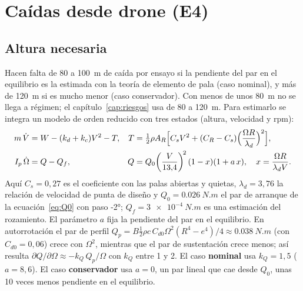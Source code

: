 \section{Caídas desde drone (E4)}\label{sec:ensayos-drone}

\subsection{Altura necesaria}
Hacen falta de 80 a \SI{100}{m} de caída por ensayo si la pendiente del par en el
equilibrio es la estimada con la teoría de elemento de pala (caso nominal), y más de
\SI{120}{m} si es mucho menor (caso conservador). Con menos de unos \SI{80}{m} no se llega
a régimen; el capítulo~\ref{cap:riesgos} usa de 80 a \SI{120}{m}. Para estimarlo se
integra un modelo de orden reducido con tres estados (altura, velocidad y rpm):
\begin{align}
  m\,\dot V &= W - (k_d+k_c)V^2 - T, &
  T &= \tfrac12\rho A_R\Bigl[C_s V^2 + (C_{R} - C_s)\Bigl(\frac{\Omega R}{\lambda_d}\Bigr)^2\Bigr],
  \label{eq:ensayos-modeloV}\\
  I_p\,\dot\Omega &= Q - Q_f, &
  Q &= Q_0\!\left(\frac{V}{13{,}4}\right)^{\!2}(1-x)(1+a\,x),\quad x=\frac{\Omega R}{\lambda_d V}.
  \label{eq:ensayos-modeloQ}
\end{align}
Aquí $C_s=0{,}27$ es el coeficiente con las palas abiertas y quietas,
$\lambda_d=3{,}76$ la relación de velocidad de punta de diseño y $Q_0=\SI{0.026}{N.m}$ el
par de arranque de la ecuación~\eqref{eq:Q0} con paso \ang{-2};
$Q_f=\SI{3e-4}{N.m}$ es una estimación del rozamiento. El parámetro $a$ fija la pendiente
del par en el equilibrio. En autorrotación el par de perfil
$Q_p=B\tfrac12\rho c\,C_{d0}\Omega^2(R^4-e^4)/4\approx\SI{0.038}{N.m}$ (con $C_{d0}=0{,}06$)
crece con $\Omega^2$, mientras que el par de sustentación crece menos; así resulta
$\partial Q/\partial\Omega\approx-k_Q\,Q_p/\Omega$ con $k_Q$ entre 1 y 2. El caso
\textbf{nominal} usa $k_Q=1{,}5$ ($a=8{,}6$). El caso \textbf{conservador} usa $a=0$, un
par lineal que cae desde $Q_0$, unas 10 veces menos pendiente en el equilibrio.

